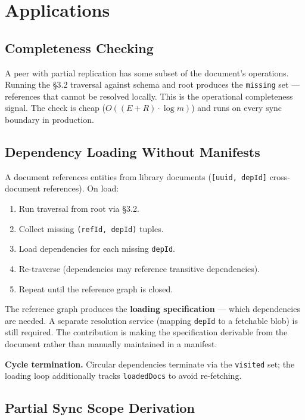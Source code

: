 \section{Applications}

\subsection{Completeness Checking}

A peer with partial replication has some subset of the document's operations. Running the \S3.2 traversal against schema and root produces the \texttt{missing} set --- references that cannot be resolved locally. This is the operational completeness signal. The check is cheap ($O((E + R) \cdot \log m)$) and runs on every sync boundary in production.

\subsection{Dependency Loading Without Manifests}

A document references entities from library documents (\texttt{[uuid, depId]} cross-document references). On load:

\begin{enumerate}
    \item Run traversal from root via \S3.2.
    \item Collect missing \texttt{(refId, depId)} tuples.
    \item Load dependencies for each missing \texttt{depId}.
    \item Re-traverse (dependencies may reference transitive dependencies).
    \item Repeat until the reference graph is closed.
\end{enumerate}

The reference graph produces the \textbf{loading specification} --- which dependencies are needed. A separate resolution service (mapping \texttt{depId} to a fetchable blob) is still required. The contribution is making the specification derivable from the document rather than manually maintained in a manifest.

\textbf{Cycle termination.} Circular dependencies terminate via the \texttt{visited} set; the loading loop additionally tracks \texttt{loadedDocs} to avoid re-fetching.

\subsection{Partial Sync Scope Derivation}

